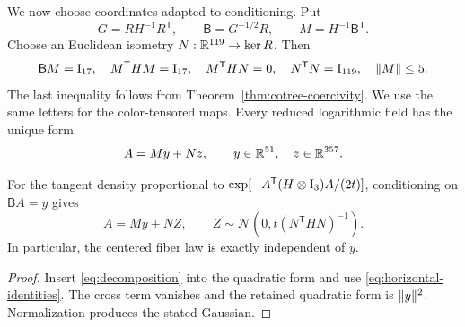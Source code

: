 We now choose coordinates adapted to conditioning.  Put
\[
 G=RH^{-1}R^{\mathsf T},\qquad
 \mathsf B=G^{-1/2}R,\qquad M=H^{-1}\mathsf B^{\mathsf T}.
\]
Choose an Euclidean isometry $N:\mathbb R^{119}\to\ker R$.  Then
\begin{equation}\label{eq:horizontal-identities}
 \mathsf BM=\mathrm I_{17},\quad M^{\mathsf T}HM=\mathrm I_{17},\quad
 M^{\mathsf T}HN=0,\quad N^{\mathsf T}N=\mathrm I_{119},
 \quad \lVert M\rVert\le5.
\end{equation}
The last inequality follows from Theorem~\ref{thm:cotree-coercivity}.  We use
the same letters for the color-tensored maps.  Every reduced logarithmic field
has the unique form
\begin{equation}\label{eq:decomposition}
 A=My+Nz,\qquad y\in\mathbb R^{51},\quad z\in\mathbb R^{357}.
\end{equation}

\begin{proposition}\label{prop:gaussian}
For the tangent density proportional to
$\exp[-A^{\mathsf T}(H\otimes\mathrm I_3)A/(2t)]$, conditioning on $\mathsf BA=y$ gives
\[
 A=My+NZ,\qquad
 Z\sim\mathcal N\!\left(0,t(N^{\mathsf T}HN)^{-1}\right).
\]
In particular, the centered fiber law is exactly independent of $y$.
\end{proposition}

\begin{proof}
Insert \eqref{eq:decomposition} into the quadratic form and use
\eqref{eq:horizontal-identities}.  The cross term vanishes and the retained
quadratic form is $\lVert y\rVert^2$.  Normalization produces the stated Gaussian.
\end{proof}
